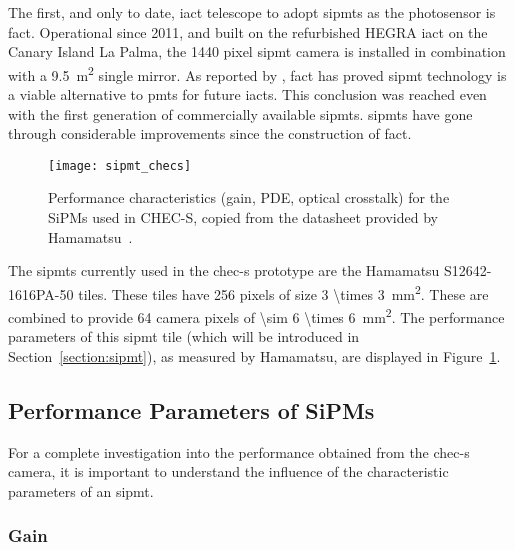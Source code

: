 The first, and only to date, \gls{iact} telescope to adopt \glspl{sipmt} as the photosensor is \gls{fact}. Operational since 2011, and built on the refurbished
HEGRA \gls{iact} on the Canary Island La Palma, the 1440 pixel \gls{sipmt} camera is installed in combination with a \SI{9.5}{m\squared} single mirror. As reported by \textcite{Biland2015}, \gls{fact} has proved \gls{sipmt} technology is a viable alternative to \glspl{pmt} for future \glspl{iact}. This conclusion was reached even with the first generation of commercially available \glspl{sipmt}. \glspl{sipmt} have gone through considerable improvements since the construction of \gls{fact}.

\begin{figure}
	\centering
    \texttt{[image: sipmt\_checs]} 
	\caption[Performance characteristics for the SiPMs used in CHEC-S.]{Performance characteristics (gain, PDE, optical crosstalk) for the SiPMs used in CHEC-S, copied from the datasheet provided by Hamamatsu~\cite{Hamamatsu2013}.}
	\label{fig:sipmt_checs}
\end{figure}

The \glspl{sipmt} currently used in the \gls{chec-s} prototype are the Hamamatsu S12642-1616PA-50 tiles. These tiles have 256 pixels of size \SI[parse-numbers = false]{3 \times 3}{mm\squared}. These are combined to provide 64 camera pixels of \SI[parse-numbers = false]{\sim 6 \times 6}{mm\squared}. The performance parameters of this \gls{sipmt} tile (which will be introduced in Section~\ref{section:sipmt}), as measured by Hamamatsu, are displayed in Figure~\ref{fig:sipmt_checs}.

\subsection{Performance Parameters of SiPMs} \label{section:sipmt_parameters}

For a complete investigation into the performance obtained from the \gls{chec-s} camera, it is important to understand the influence of the characteristic parameters of an \gls{sipmt}.

\subsubsection{Gain}

